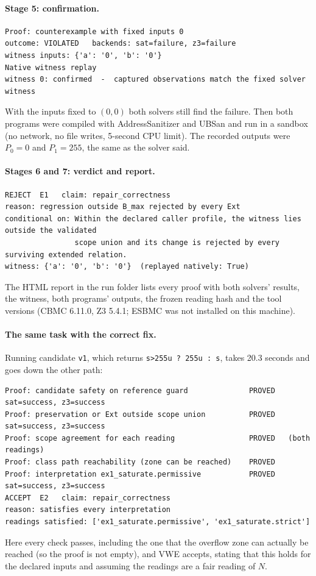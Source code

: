 \documentclass[10pt,a4paper]{article}
\newcommand{\Pz}{P_0}\newcommand{\Po}{P_1}
\begin{document}
\paragraph{Stage 5: confirmation.}\mbox{}\par
\begin{lstlisting}[language={}]
Proof: counterexample with fixed inputs 0
outcome: VIOLATED   backends: sat=failure, z3=failure
witness inputs: {'a': '0', 'b': '0'}
Native witness replay
witness 0: confirmed  -  captured observations match the fixed solver witness
\end{lstlisting}
With the inputs fixed to $(0,0)$ both solvers still find the failure. Then both programs were
compiled with AddressSanitizer and UBSan and run in a sandbox (no network, no file writes, 5-second
CPU limit). The recorded outputs were $\Pz=0$ and $\Po=255$, the same as the solver said.

\paragraph{Stages 6 and 7: verdict and report.}\mbox{}\par
\begin{lstlisting}[language={}]
REJECT  E1   claim: repair_correctness
reason: regression outside B_max rejected by every Ext
conditional on: Within the declared caller profile, the witness lies outside the validated
                scope union and its change is rejected by every surviving extended relation.
witness: {'a': '0', 'b': '0'}  (replayed natively: True)
\end{lstlisting}
The HTML report in the run folder lists every proof with both solvers' results, the witness, both
programs' outputs, the frozen reading hash and the tool versions (CBMC 6.11.0, Z3 5.4.1; ESBMC was
not installed on this machine).

\paragraph{The same task with the correct fix.} Running candidate \texttt{v1}, which returns
\texttt{s>255u ? 255u : s}, takes 20.3 seconds and goes down the other path:
\begin{lstlisting}[language={}]
Proof: candidate safety on reference guard              PROVED   sat=success, z3=success
Proof: preservation or Ext outside scope union          PROVED   sat=success, z3=success
Proof: scope agreement for each reading                 PROVED   (both readings)
Proof: class path reachability (zone can be reached)    PROVED
Proof: interpretation ex1_saturate.permissive           PROVED   sat=success, z3=success
ACCEPT  E2   claim: repair_correctness
reason: satisfies every interpretation
readings satisfied: ['ex1_saturate.permissive', 'ex1_saturate.strict']
\end{lstlisting}
Here every check passes, including the one that the overflow zone can actually be reached (so the
proof is not empty), and VWE accepts, stating that this holds for the declared inputs and assuming
the readings are a fair reading of $N$.
\end{document}
